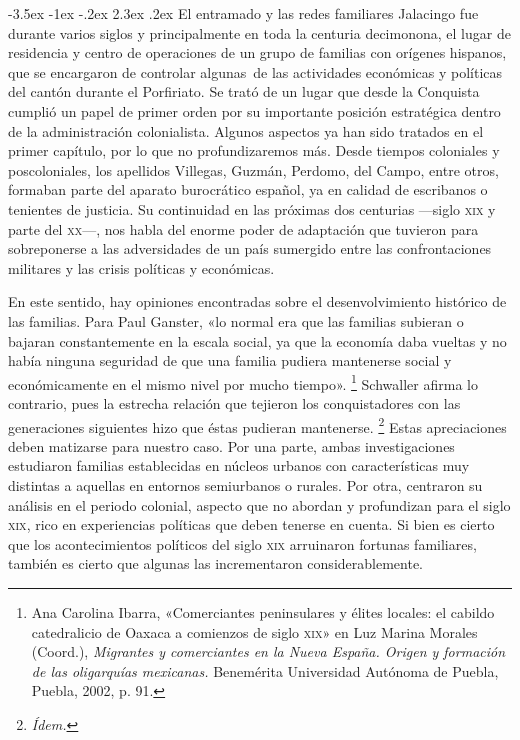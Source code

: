 \documentclass[14pt,twoside,final]{extbook} %
\makeatletter
\let\oldfootnote\footnote
\renewcommand\footnote[1]{%
\oldfootnote{\hspace{1mm}#1}}
\renewcommand\section{\@startsection {section}{1}{\z@}%
                                     {-3.5ex \@plus -1ex \@minus -.2ex}%
                                     {2.3ex \@plus .2ex}%
                                     {\normalfont\large\bfseries\sc}}
\makeatother
\begin{document}
\section{El entramado y las redes familiares}
\label{sec:entramado-y-redes-familiares}
Jalacingo fue durante varios siglos y principalmente en toda la centuria decimonona, el lugar de residencia y centro de operaciones de un grupo de familias con orígenes hispanos, que se encargaron de controlar algunas~de las actividades económicas y políticas del cantón durante el Porfiriato. Se trató de un lugar que desde la Conquista cumplió un papel de primer orden por su importante posición estratégica dentro de la administración colonialista. Algunos aspectos ya han sido tratados en el primer capítulo, por lo que no profundizaremos más. Desde tiempos coloniales y poscoloniales, los apellidos Villegas, Guzmán, Perdomo, del Campo, entre otros, formaban parte del aparato burocrático español, ya en calidad de escribanos o tenientes de justicia. Su continuidad en las próximas dos centurias ---siglo \textsc{xix} y parte del \textsc{xx}---, nos habla del enorme poder de adaptación que tuvieron para sobreponerse a las adversidades de un país sumergido entre las confrontaciones militares y las crisis políticas y económicas. \pagebreak[4]

En este sentido, hay opiniones encontradas sobre el desenvolvimiento histórico de las familias. Para Paul Ganster, «lo normal era que las familias subieran o bajaran constantemente en la escala social, ya que la economía daba vueltas y no había ninguna seguridad de que una familia pudiera mantenerse social y económicamente en el mismo nivel por mucho tiempo».\footnote{Ana Carolina Ibarra, «Comerciantes peninsulares y élites locales: el cabildo catedralicio de Oaxaca a comienzos de siglo \textsc{xix}» en Luz Marina Morales (Coord.), \emph{Migrantes y comerciantes en la Nueva España. Origen y formación de las oligarquías mexicanas.} Benemérita Universidad Autónoma de Puebla, Puebla, 2002, p. 91.} Schwaller afirma lo contrario, pues la estrecha relación que tejieron los conquistadores con las generaciones siguientes hizo que éstas pudieran mantenerse.\footnote{\em Ídem.} Estas apreciaciones deben matizarse para nuestro caso. Por una parte, ambas investigaciones estudiaron familias establecidas en núcleos urbanos con características muy distintas a aquellas en entornos semiurbanos o rurales. Por otra, centraron su análisis en el periodo colonial, aspecto que no abordan y profundizan para el siglo \textsc{xix}, rico en experiencias políticas que deben tenerse en cuenta. Si bien es cierto que los acontecimientos políticos del siglo \textsc{xix} arruinaron fortunas familiares, también es cierto que algunas las incrementaron considerablemente.
\end{document}
